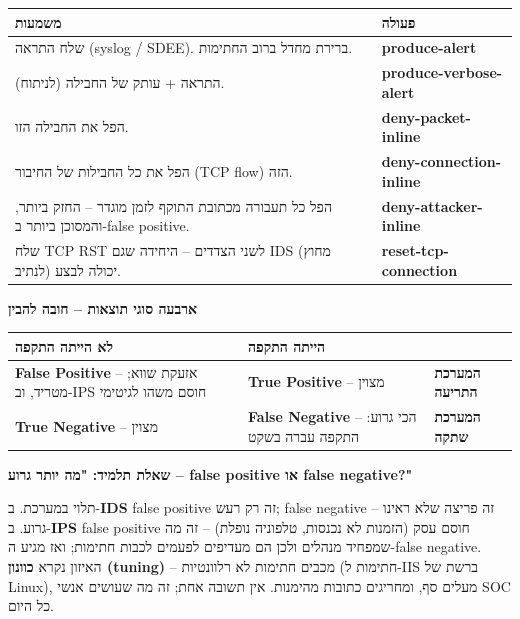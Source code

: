 \documentclass[11pt]{article}
\newcommand{\enLR}[1]{\textenglish{#1}}
\newcommand{\subheading}[1]{\vskip6pt{\bfseries\color{h3}#1\par}\vskip2pt}
\newcommand{\boxtitle}[1]{{\bfseries\color{boxti}#1}}
\newenvironment{faqbox}{\colorlet{boxti}{faqti}\begin{mdframed}[backgroundcolor=faqbg,linecolor=faqfr,rightline=true,leftline=false,topline=false,bottomline=false,linewidth=2pt,innertopmargin=6pt,innerbottommargin=6pt,innerleftmargin=8pt,innerrightmargin=8pt,skipabove=6pt,skipbelow=6pt]}{\end{mdframed}}
\begin{document}
\begin{xltabular}{\linewidth}{|>{\setRTL\raggedleft\arraybackslash}X|>{\setRTL\raggedleft\arraybackslash}X|}
\hline
{}\textbf{משמעות} & \textbf{פעולה} \\
\hline
\endhead
שלח התראה \enLR{(syslog / SDEE).} ברירת מחדל ברוב החתימות. & \textbf{\enLR{produce-alert}} \\
\hline
התראה + עותק של החבילה (לניתוח). & \textbf{\enLR{produce-verbose-alert}} \\
\hline
הפל את החבילה הזו. & \textbf{\enLR{deny-packet-inline}} \\
\hline
הפל את כל החבילות של החיבור \enLR{(TCP flow)} הזה. & \textbf{\enLR{deny-connection-inline}} \\
\hline
הפל כל תעבורה מכתובת התוקף לזמן מוגדר – החזק ביותר, והמסוכן ביותר ב-\enLR{false positive.} & \textbf{\enLR{deny-attacker-inline}} \\
\hline
שלח \enLR{TCP RST} לשני הצדדים – היחידה שגם \enLR{IDS} (מחוץ לנתיב) יכולה לבצע. & \textbf{\enLR{reset-tcp-connection}} \\
\hline
\end{xltabular}

\subheading{ארבעה סוגי תוצאות – חובה להבין}

\begin{xltabular}{\linewidth}{|>{\setRTL\raggedleft\arraybackslash}X|>{\setRTL\raggedleft\arraybackslash}X|>{\setRTL\raggedleft\arraybackslash}X|}
\hline
{}\textbf{לא הייתה התקפה} & \textbf{הייתה התקפה} & \textbf{} \\
\hline
\endhead
\textbf{\enLR{False Positive}} – אזעקת שווא; מטריד, וב-\enLR{IPS} חוסם משהו לגיטימי & \textbf{\enLR{True Positive}} – מצוין & \textbf{המערכת התריעה} \\
\hline
\textbf{\enLR{True Negative}} – מצוין & \textbf{\enLR{False Negative}} – הכי גרוע: התקפה עברה בשקט & \textbf{המערכת שתקה} \\
\hline
\end{xltabular}

\begin{faqbox}\boxtitle{שאלת תלמיד: "מה יותר גרוע – \enLR{false positive} או \enLR{false negative}?"}\par  תלוי במערכת. ב-\textbf{\enLR{IDS}} \enLR{false positive} זה רק רעש; \enLR{false negative} זה פריצה שלא ראינו – גרוע. ב-\textbf{\enLR{IPS}} \enLR{false positive} חוסם עסק (הזמנות לא נכנסות, טלפוניה נופלת) – זה מה שמפחיד מנהלים ולכן הם מעדיפים לפעמים לכבות חתימות; ואז מגיע ה-\enLR{false negative.} האיזון נקרא \textbf{כוונון \enLR{(tuning)}} – מכבים חתימות לא רלוונטיות (חתימות ל-\enLR{IIS} ברשת של \enLR{Linux)}, מעלים סף, ומחריגים כתובות מהימנות. אין תשובה אחת; זה מה שעושים אנשי \enLR{SOC} כל היום.\end{faqbox}
\end{document}
